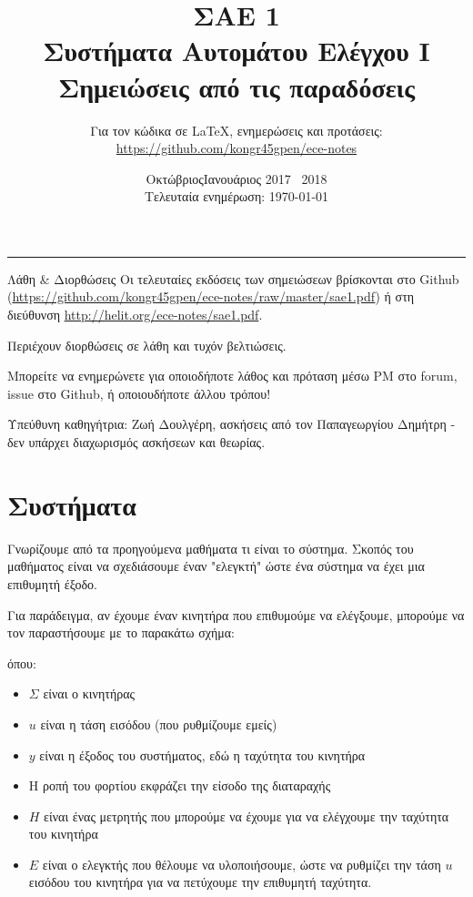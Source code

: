 \documentclass[11pt,a4paper,notitlepage,fleqn,final]{article}
\title{ΣΑΕ 1
	\\
	{ 
		\normalsize Συστήματα Αυτομάτου Ελέγχου I
		\\
		\normalsize Σημειώσεις από τις παραδόσεις
	}}
\date{Οκτώβριος\textendash Ιανουάριος 2017 \textendash~2018
	\\
	{ 
		\small Τελευταία ενημέρωση: \today
	}
}
\author{
	Για τον κώδικα σε \LaTeX, ενημερώσεις και προτάσεις:
	\\
	\url{https://github.com/kongr45gpen/ece-notes}}
\begin{document}
\maketitle

\hrule
\vspace{50pt}

\begin{infobox}{Λάθη \& Διορθώσεις}
	Οι τελευταίες εκδόσεις των σημειώσεων βρίσκονται στο Github
	(\url{https://github.com/kongr45gpen/ece-notes/raw/master/sae1.pdf}) ή
	στη διεύθυνση \url{http://helit.org/ece-notes/sae1.pdf}.
	
	Περιέχουν διορθώσεις σε λάθη και τυχόν βελτιώσεις.
	
	\tcblower
	
	Μπορείτε να ενημερώνετε για οποιοδήποτε λάθος και πρόταση
	μέσω PM στο forum, issue στο Github, ή οποιουδήποτε άλλου τρόπου!
\end{infobox}
	
Υπεύθυνη καθηγήτρια: Ζωή Δουλγέρη, ασκήσεις από τον Παπαγεωργίου Δημήτρη - δεν υπάρχει διαχωρισμός ασκήσεων και θεωρίας.

\newpage

\tableofcontents

\newpage

\section{Συστήματα}
Γνωρίζουμε από τα προηγούμενα μαθήματα τι είναι το σύστημα. Σκοπός του μαθήματος είναι να σχεδιάσουμε έναν "ελεγκτή" ώστε ένα σύστημα να έχει μια επιθυμητή έξοδο.

Για παράδειγμα, αν έχουμε έναν κινητήρα που επιθυμούμε να ελέγξουμε, μπορούμε να τον παραστήσουμε με το παρακάτω σχήμα:


όπου:
\begin{itemize}
	\item \( \Sigma \) είναι ο κινητήρας
	\item \( u \) είναι η τάση εισόδου (που ρυθμίζουμε εμείς)
	\item \( y \) είναι η έξοδος του συστήματος, εδώ η ταχύτητα του κινητήρα
	\item Η ροπή του φορτίου εκφράζει την είσοδο της διαταραχής
	\item \( H \) είναι ένας μετρητής που μπορούμε να έχουμε για να ελέγχουμε την ταχύτητα
	του κινητήρα
	\item \( E \) είναι ο ελεγκτής που θέλουμε να υλοποιήσουμε, ώστε να ρυθμίζει την
	τάση \( u \) εισόδου του κινητήρα για να πετύχουμε την επιθυμητή ταχύτητα.
\end{itemize}
\end{document}
